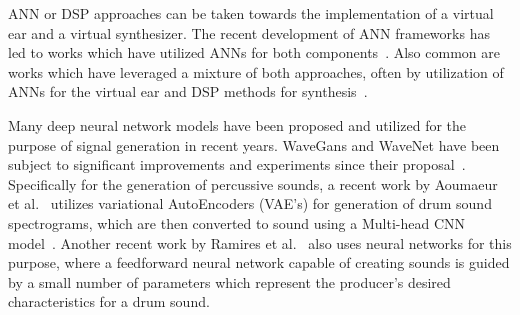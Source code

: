 \documentclass[\main/thesis.tex]{subfiles}
\begin{document}
ANN or DSP approaches can be taken towards the implementation of a virtual ear and a virtual synthesizer. The recent development of ANN frameworks has led to works which have utilized ANNs for both components~\cite{oord2016wavenet,yamamoto2020parallel,ramires2020neural}. Also common are works which have leveraged a mixture of both approaches, often by utilization of ANNs for the virtual ear and DSP methods for synthesis~\cite{aouameur2019neural,yee2018automatic}.

Many deep neural network models have been proposed and utilized for the purpose of signal generation in recent years. WaveGans and WaveNet have been subject to significant improvements and experiments since their proposal~\cite{nsynth2017,yamamoto2020parallel,oord2017parallel}. Specifically for the generation of percussive sounds, a recent work by Aoumaeur et al.~\cite{aouameur2019neural} utilizes variational AutoEncoders (VAE's) for generation of drum sound spectrograms, which are then converted to sound using a Multi-head CNN model~\cite{aouameur2019neural}. Another recent work by Ramires et al.~\cite{ramires2020neural} also uses neural networks for this purpose, where a feedforward neural network capable of creating sounds is guided by a small number of parameters which represent the producer's desired characteristics for a drum sound. 
\end{document}
